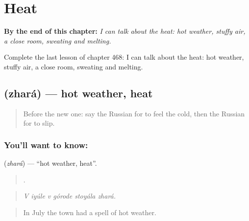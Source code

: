 
\chapter{Heat}
\label{ch:ru-heat}

\begin{chapteropening}
\textbf{By the end of this chapter:} \emph{I can talk about the heat: hot weather, stuffy air, a close room, sweating and melting.}

Complete the last lesson of chapter 468: I can talk about the heat: hot weather, stuffy air, a close room, sweating and melting.
\end{chapteropening}

\section[\texorpdfstring{\ru{жара} (zhará)}{жара (zhará)}]{ (zhará) — hot weather, heat}

\label{lesson:RU-C468-zhara}



\begin{quote}
Before the new one: say the Russian for to feel the cold, then the Russian for to slip.
\end{quote}

\subsection*{You'll want to know: }
\textbf{} (\emph{zhará}) — \textquotedblleft{}hot weather, heat\textquotedblright{}.

\begin{quote}
     .
\end{quote}

\begin{quote}
\emph{V iyúle v górode stoyála zhará.}
\end{quote}

\begin{quote}
In July the town had a spell of hot weather.
\end{quote}

